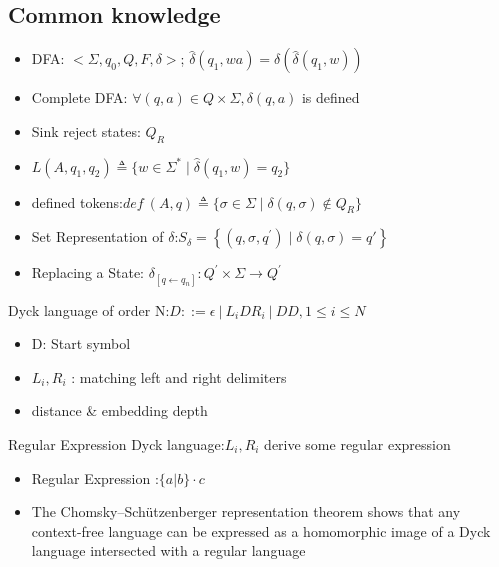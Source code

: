\documentclass[aspectratio=169%
,serif,mathserif]{beamer}
\begin{document}
\subsection{Common knowledge}
\begin{frame}
	\begin{itemize}
		\item DFA: $<\Sigma,q_0,Q,F,\delta>$; $\hat{\delta}\left(q_{1}, wa\right) = \delta(\hat{\delta}\left(q_{1}, w\right))$
		\item Complete DFA: $\forall (q,a) \in Q \times \Sigma, \delta(q,a)$ is defined
		\item Sink reject states: $Q_R$
		\item $L(A, q_{1}, q_{2}) \triangleq\{w \in \Sigma^{*} \mid \hat{\delta}(q_{1}, w)=q_{2}\}$
		\item defined tokens:$def~(A,q) \triangleq \{\sigma \in \Sigma \mid \delta(q, \sigma) \notin Q_{R}\}$
		\item Set Representation of $\delta$:$S_{\delta}=\left\{\left(q, \sigma, q^{\prime}\right) \mid \delta(q, \sigma)=q' \right\}$
		\item Replacing a State: $\delta_{\left[q \leftarrow q_{n}\right]}: Q^{\prime} \times \Sigma \rightarrow Q^{\prime}$
	\end{itemize}
		
\end{frame}

\begin{frame}
	Dyck language of order N:$D ::= \epsilon~|~L_i D R_i~|~DD, 1\leq i \leq N$
	\begin{itemize}
		\item D: Start symbol		
		\item $L_i,R_i$ : matching left and right delimiters
		\item distance \& embedding depth 
	\end{itemize}

	Regular Expression Dyck language:$L_i,R_i$ derive some regular expression
	\begin{itemize}
		\item Regular Expression :$\{a|b\}·c$
		\item The Chomsky–Schützenberger representation theorem shows that any context-free language can be expressed as
		a homomorphic image of a Dyck language intersected with a regular language
	\end{itemize}	
\end{frame}
\end{document}
